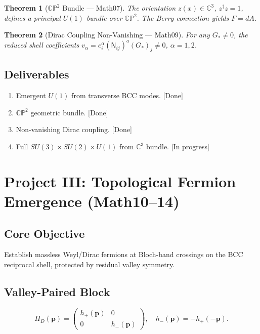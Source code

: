 \documentclass[11pt,a4paper]{article}
\newcommand{\Gstar}{G_{*}}
\newtheorem{theorem}{Theorem}[section]
\begin{document}
\begin{theorem}[$\mathbb{CP}^{2}$ Bundle --- Math07]
The orientation $z(x)\in\mathbb{C}^{3}$, $z^{\dagger}z=1$,
defines a principal $U(1)$ bundle over $\mathbb{CP}^{2}$.
The Berry connection yields $F=dA$.
\end{theorem}

\begin{theorem}[Dirac Coupling Non-Vanishing --- Math09]
For any $\Gstar\neq 0$, the reduced shell coefficients
$v_{\alpha}=e_{i}^{\alpha}(\mathsf{N}_{ij})^{a}(\Gstar)_{j}\neq0$, $\alpha=1,2$.
\end{theorem}

\subsection{Deliverables}
\begin{enumerate}
\item Emergent $U(1)$ from transverse BCC modes. \hfill\textcolor{green!55!black}{[Done]}
\item $\mathbb{CP}^{2}$ geometric bundle. \hfill\textcolor{green!55!black}{[Done]}
\item Non-vanishing Dirac coupling. \hfill\textcolor{green!55!black}{[Done]}
\item Full $SU(3)\times SU(2)\times U(1)$ from $\mathbb{C}^{3}$ bundle. \hfill\textcolor{orange!80!black}{[In progress]}
\end{enumerate}

\section{Project III: Topological Fermion Emergence (Math10--14)}

\subsection{Core Objective}
Establish massless Weyl/Dirac fermions at Bloch-band crossings on the
BCC reciprocal shell, protected by residual valley symmetry.

\subsection{Valley-Paired Block}
\begin{equation}
H_{D}(\mathbf{p})=
\begin{pmatrix}h_{+}(\mathbf{p})&0\\0&h_{-}(\mathbf{p})\end{pmatrix},
\quad h_{-}(\mathbf{p})=-h_{+}(-\mathbf{p}).
\end{equation}
\end{document}
